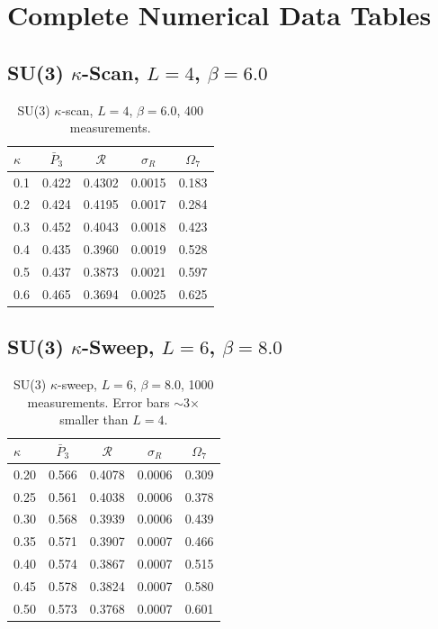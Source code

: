 \documentclass[12pt,a4paper]{article}
\newcommand{\R}{\mathcal{R}}           %
\theoremstyle{plain}
\theoremstyle{definition}
\theoremstyle{remark}
\begin{document}
\section{Complete Numerical Data Tables}
\label{app:data}

\subsection{SU(3) $\kappa$-Scan, $L=4$, $\beta=6.0$}

\begin{table}[H]
\centering
\begin{tabular}{lcccc}
\toprule
$\kappa$ & $\bar{P}_3$ & $\R$ & $\sigma_R$ & $\Omega_7$ \\
\midrule
0.1 & 0.422 & 0.4302 & 0.0015 & 0.183 \\
0.2 & 0.424 & 0.4195 & 0.0017 & 0.284 \\
0.3 & 0.452 & 0.4043 & 0.0018 & 0.423 \\
0.4 & 0.435 & 0.3960 & 0.0019 & 0.528 \\
0.5 & 0.437 & 0.3873 & 0.0021 & 0.597 \\
0.6 & 0.465 & 0.3694 & 0.0025 & 0.625 \\
\bottomrule
\end{tabular}
\caption{SU(3) $\kappa$-scan, $L=4$, $\beta=6.0$, 400 measurements.}
\end{table}

\subsection{SU(3) $\kappa$-Sweep, $L=6$, $\beta=8.0$}

\begin{table}[H]
\centering
\begin{tabular}{lcccc}
\toprule
$\kappa$ & $\bar{P}_3$ & $\R$ & $\sigma_R$ & $\Omega_7$ \\
\midrule
0.20 & 0.566 & 0.4078 & 0.0006 & 0.309 \\
0.25 & 0.561 & 0.4038 & 0.0006 & 0.378 \\
0.30 & 0.568 & 0.3939 & 0.0006 & 0.439 \\
0.35 & 0.571 & 0.3907 & 0.0007 & 0.466 \\
0.40 & 0.574 & 0.3867 & 0.0007 & 0.515 \\
0.45 & 0.578 & 0.3824 & 0.0007 & 0.580 \\
0.50 & 0.573 & 0.3768 & 0.0007 & 0.601 \\
\bottomrule
\end{tabular}
\caption{SU(3) $\kappa$-sweep, $L=6$, $\beta=8.0$, 1000 measurements.
Error bars $\sim$3$\times$ smaller than $L=4$.}
\end{table}
\end{document}

